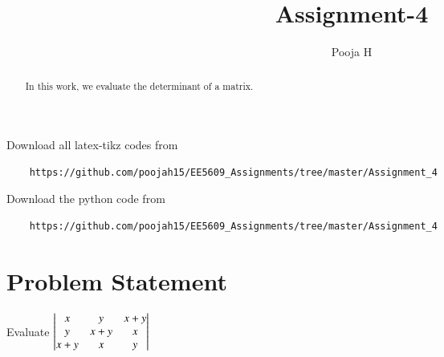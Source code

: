 \documentclass[journal,12pt,twocolumn]{IEEEtran}
\begin{document}
	\makeatother
	\let\StandardTheFigure\thefigure
	\let\vec\mathbf
	\renewcommand{\thefigure}{\theproblem}
	\def\putbox#1#2#3{\makebox[0in][l]{\makebox[#1][l]{}\raisebox{\baselineskip}[0in][0in]{\raisebox{#2}[0in][0in]{#3}}}}
	\def\rightbox#1{\makebox[0in][r]{#1}}
	\def\centbox#1{\makebox[0in]{#1}}
	\def\topbox#1{\raisebox{-\baselineskip}[0in][0in]{#1}}
	\def\midbox#1{\raisebox{-0.5\baselineskip}[0in][0in]{#1}}
	\vspace{3cm}
	\title{Assignment-4}
	\author{Pooja H \\ }
	\maketitle
	\newpage
	\bigskip
	\renewcommand{\thefigure}{\theenumi}
	\renewcommand{\thetable}{\theenumi}
	\begin{abstract}
		In this work, we evaluate the determinant of a matrix.
	\end{abstract}
	Download all latex-tikz codes from 
	\begin{lstlisting}
	https://github.com/poojah15/EE5609_Assignments/tree/master/Assignment_4
	\end{lstlisting}
   Download the python code from
\begin{lstlisting}	
    https://github.com/poojah15/EE5609_Assignments/tree/master/Assignment_4
\end{lstlisting}
	\section{Problem Statement}
    Evaluate $\begin{vmatrix}x & y & x+y\\ y & x+y & x\\ x+y & x &y\end{vmatrix}$
	
\end{document}
